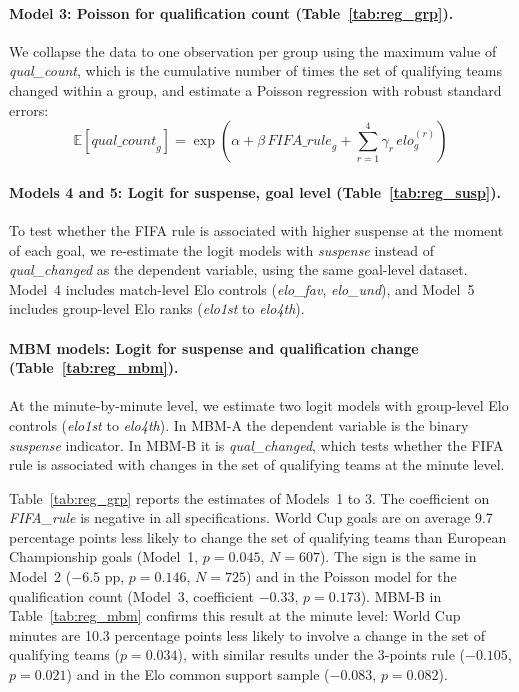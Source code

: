 \documentclass[11pt]{article}
\begin{document}
\paragraph{Model 3: Poisson for qualification count (Table~\ref{tab:reg_grp}).}
We collapse the data to one observation per group using the maximum value of \textit{qual\_count}, which is the cumulative number of times the set of qualifying teams changed within a group, and estimate a Poisson regression with robust standard errors:
\[
\mathbb{E}[\textit{qual\_count}_g]
  = \exp\!\left(\alpha + \beta\,\textit{FIFA\_rule}_g
  + \sum_{r=1}^{4} \gamma_r\,\textit{elo}^{(r)}_g\right)
\]

\paragraph{Models 4 and 5: Logit for suspense, goal level (Table~\ref{tab:reg_susp}).}
To test whether the FIFA rule is associated with higher suspense at the moment of each goal, we re-estimate the logit models with \textit{suspense} instead of \textit{qual\_changed} as the dependent variable, using the same goal-level dataset. Model~4 includes match-level Elo controls (\textit{elo\_fav}, \textit{elo\_und}), and Model~5 includes group-level Elo ranks (\textit{elo1st} to \textit{elo4th}).

\paragraph{MBM models: Logit for suspense and qualification change (Table~\ref{tab:reg_mbm}).}
At the minute-by-minute level, we estimate two logit models with group-level Elo controls (\textit{elo1st} to \textit{elo4th}). In MBM-A the dependent variable is the binary \textit{suspense} indicator. In MBM-B it is \textit{qual\_changed}, which tests whether the FIFA rule is associated with changes in the set of qualifying teams at the minute level.

Table~\ref{tab:reg_grp} reports the estimates of Models~1 to 3. The coefficient on \textit{FIFA\_rule} is negative in all specifications. World Cup goals are on average 9.7 percentage points less likely to change the set of qualifying teams than European Championship goals (Model~1, $p = 0.045$, $N = 607$). The sign is the same in Model~2 ($-6.5$ pp, $p = 0.146$, $N = 725$) and in the Poisson model for the qualification count (Model~3, coefficient $-0.33$, $p = 0.173$). MBM-B in Table~\ref{tab:reg_mbm} confirms this result at the minute level: World Cup minutes are 10.3 percentage points less likely to involve a change in the set of qualifying teams ($p = 0.034$), with similar results under the 3-points rule ($-0.105$, $p = 0.021$) and in the Elo common support sample ($-0.083$, $p = 0.082$).
\end{document}
